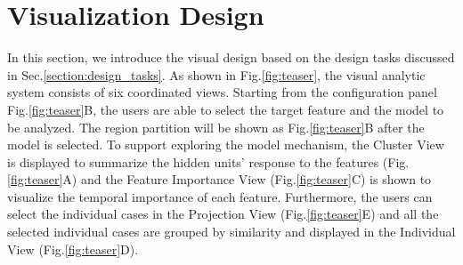 \section{Visualization Design}


In this section, we introduce the visual design based on the design tasks discussed in Sec.\ref{section:design_tasks}.  As shown in Fig.\ref{fig:teaser}, the visual analytic system consists of six coordinated views. Starting from the configuration panel Fig.\ref{fig:teaser}B, the users are able to select the target feature and the model to be analyzed. The region partition will be shown as Fig.\ref{fig:teaser}B after the model is selected. To support exploring the model mechanism, the Cluster View is displayed to summarize the hidden units' response to the features (Fig.\ref{fig:teaser}A) and the Feature Importance View (Fig.\ref{fig:teaser}C) is shown to visualize the temporal importance of each feature. Furthermore, the users can select the individual cases in the Projection View (Fig.\ref{fig:teaser}E) and all the selected individual cases are grouped by similarity and displayed in the Individual View (Fig.\ref{fig:teaser}D).






